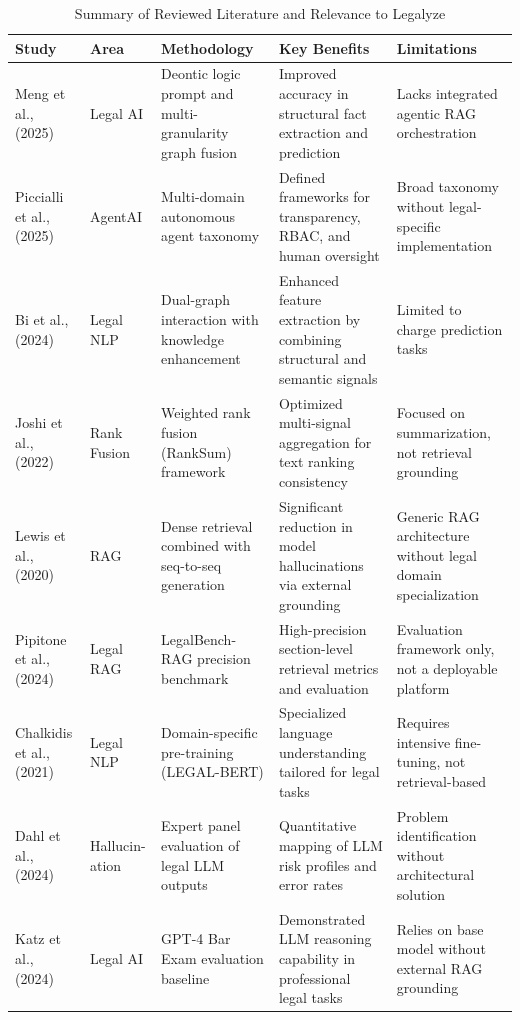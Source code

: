 \documentclass[a4paper,fleqn]{cas-dc}
\begin{document}
\renewcommand{\arraystretch}{1.4} 
\setlength{\extrarowheight}{5pt} 
\begin{table}[t!]
\caption{Summary of Reviewed Literature and Relevance to Legalyze}
\small
\centering
\begin{tabular}{|m{2.3cm}|m{1.5cm}|m{3cm}|m{4cm}|m{4cm}|}
\hline
\textbf{Study} & \textbf{Area} & \textbf{Methodology} & \textbf{Key Benefits} & \textbf{Limitations} \\ \hline
Meng et al., (2025) & Legal AI & Deontic logic prompt and multi-granularity graph fusion & Improved accuracy in structural fact extraction and prediction & Lacks integrated agentic RAG orchestration \\ \hline
Piccialli et al., (2025) & AgentAI & Multi-domain autonomous agent taxonomy & Defined frameworks for transparency, RBAC, and human oversight & Broad taxonomy without legal-specific implementation \\ \hline
Bi et al., (2024) & Legal NLP & Dual-graph interaction with knowledge enhancement & Enhanced feature extraction by combining structural and semantic signals & Limited to charge prediction tasks \\ \hline
Joshi et al., (2022) & Rank Fusion & Weighted rank fusion (RankSum) framework & Optimized multi-signal aggregation for text ranking consistency & Focused on summarization, not retrieval grounding \\ \hline
Lewis et al., (2020) & RAG & Dense retrieval combined with seq-to-seq generation & Significant reduction in model hallucinations via external grounding & Generic RAG architecture without legal domain specialization \\ \hline
Pipitone et al., (2024) & Legal RAG & LegalBench-RAG precision benchmark & High-precision section-level retrieval metrics and evaluation & Evaluation framework only, not a deployable platform \\ \hline
Chalkidis et al., (2021) & Legal NLP & Domain-specific pre-training (LEGAL-BERT) & Specialized language understanding tailored for legal tasks & Requires intensive fine-tuning, not retrieval-based \\ \hline
Dahl et al., (2024) & Hallucin-ation& Expert panel evaluation of legal LLM outputs & Quantitative mapping of LLM risk profiles and error rates & Problem identification without architectural solution \\ \hline
Katz et al., (2024) & Legal AI & GPT-4 Bar Exam evaluation baseline & Demonstrated LLM reasoning capability in professional legal tasks & Relies on base model without external RAG grounding \\ \hline

\end{tabular}
\end{table}
\end{document}
